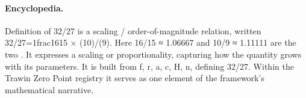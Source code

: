 \paragraph{Encyclopedia.}
Definition of 32/27 is a scaling / order-of-magnitude relation, written 32/27=1frac1615 × (10)/(9). Here 16/15 ≈ 1.06667 and 10/9 ≈ 1.11111 are the two . It expresses a scaling or proportionality, capturing how the quantity grows with its parameters. It is built from f, r, a, c, H, n, defining 32/27. Within the Trawin Zero Point registry it serves as one element of the framework's mathematical narrative.
